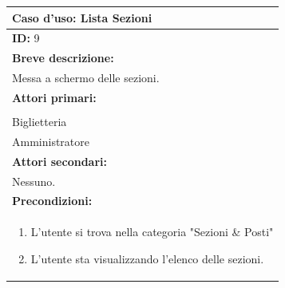 \documentclass{article}
\begin{document}
                \begin{table}[H]
                    \begin{tabular}{|p{\linewidth}|}
                        \hline
                        \cellcolor{gray!100}
                        \color{white}
                        \centerline{\textbf{Caso d'uso:} Lista Sezioni} \\ 
                        \hline
                        \textbf{ID:} 9 \\
                        \hline
                        \cellcolor{gray!20}
                        \textbf{Breve descrizione:} \\
                        \cellcolor{gray!20}
                        Messa a schermo delle sezioni. \\
                        \hline
                        \textbf{Attori primari:} \\
                        \begin{minipage}{\linewidth}
                            Cliente \\
                            Biglietteria \\
                            Amministratore 
                        \end{minipage}
                        \vspace{0pt} \\  %
                        \hline
                        \textbf{Attori secondari:} \\
                        Nessuno. \\
                        \hline
                        \cellcolor{gray!20}
                        \textbf{Precondizioni:} \\
                        \cellcolor{gray!20}
                        \begin{minipage}{\linewidth}
                            \begin{enumerate}
                            	\item L'utente si trova nella categoria "Sezioni \& Posti"
                                \item L'utente sta visualizzando l'elenco delle sezioni.
                            \end{enumerate}
                        \end{minipage} 

\end{tabular}
\end{table}
\end{document}
